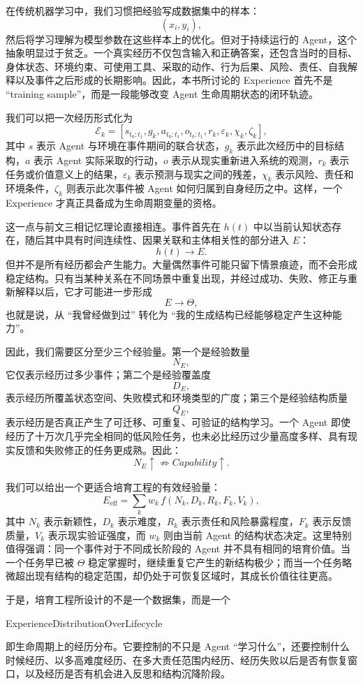 在传统机器学习中，我们习惯把经验写成数据集中的样本：
\[
(x_i,y_i),
\]
然后将学习理解为模型参数在这些样本上的优化。但对于持续运行的 Agent，这个抽象明显过于贫乏。一个真实经历不仅包含输入和正确答案，还包含当时的目标、身体状态、环境约束、可使用工具、采取的动作、行为后果、风险、责任、自我解释以及事件之后形成的长期影响。因此，本书所讨论的 Experience 首先不是 ``training sample''，而是一段能够改变 Agent 生命周期状态的闭环轨迹。

我们可以把一次经历形式化为
\[
\mathcal{E}_k
=
\left[
s_{t_0:t_1},
g_k,
a_{t_0:t_1},
o_{t_0:t_1},
r_k,
\varepsilon_k,
\chi_k,
\zeta_k
\right],
\]
其中 $s$ 表示 Agent 与环境在事件期间的联合状态，$g_k$ 表示此次经历中的目标结构，$a$ 表示 Agent 实际采取的行动，$o$ 表示从现实重新进入系统的观测，$r_k$ 表示任务或价值意义上的结果，$\varepsilon_k$ 表示预测与现实之间的残差，$\chi_k$ 表示风险、责任和环境条件，$\zeta_k$ 则表示此次事件被 Agent 如何归属到自身经历之中。这样，一个 Experience 才真正具备成为生命周期变量的资格。

这一点与前文三相记忆理论直接相连。事件首先在 $h(t)$ 中以当前认知状态存在，随后其中具有时间连续性、因果关联和主体相关性的部分进入 $E$：
\[
h(t)
\rightarrow
E.
\]
但并不是所有经历都会产生能力。大量偶然事件可能只留下情景痕迹，而不会形成稳定结构。只有当某种关系在不同场景中重复出现，并经过成功、失败、修正与重新解释以后，它才可能进一步形成
\[
E
\rightarrow
\Theta,
\]
也就是说，从 ``我曾经做到过'' 转化为 ``我的生成结构已经能够稳定产生这种能力''。

因此，我们需要区分至少三个经验量。第一个是经验数量
\[
N_E,
\]
它仅表示经历过多少事件；第二个是经验覆盖度
\[
D_E,
\]
表示经历所覆盖状态空间、失败模式和环境类型的广度；第三个是经验结构质量
\[
Q_E,
\]
表示经历是否真正产生了可迁移、可重复、可验证的结构学习。一个 Agent 即使经历了十万次几乎完全相同的低风险任务，也未必比经历过少量高度多样、具有现实反馈和失败修正的任务更成熟。因此：
\[
N_E\uparrow
\not\Rightarrow
Capability\uparrow.
\]

我们可以给出一个更适合培育工程的有效经验量：
\[
E_{\mathrm{eff}}
=
\sum_{k}
w_k
\,
f(
N_k,
D_k,
R_k,
F_k,
V_k
),
\]
其中 $N_k$ 表示新颖性，$D_k$ 表示难度，$R_k$ 表示责任和风险暴露程度，$F_k$ 表示反馈质量，$V_k$ 表示现实验证强度，而 $w_k$ 则由当前 Agent 的结构状态决定。这里特别值得强调：同一个事件对于不同成长阶段的 Agent 并不具有相同的培育价值。当一个任务早已被 $\Theta$ 稳定掌握时，继续重复它产生的新结构极少；而当一个任务略微超出现有结构的稳定范围，却仍处于可恢复区域时，其成长价值往往更高。

于是，培育工程所设计的不是一个数据集，而是一个
\begin{statementbox}
ExperienceDistributionOverLifecycle
\end{statementbox}
即生命周期上的经历分布。它要控制的不只是 Agent ``学习什么''，还要控制什么时候经历、以多高难度经历、在多大责任范围内经历、经历失败以后是否有恢复窗口，以及经历是否有机会进入反思和结构沉降阶段。

